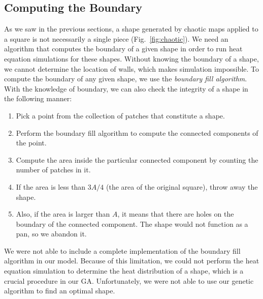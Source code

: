 \documentclass[12pt]{reedmcm}
\begin{document}
\subsection{Computing the Boundary}
As we saw in the previous sections, a shape generated by chaotic maps applied to a square is not necessarily a single piece (Fig.~\ref{fig:chaotic}).
We need an algorithm that computes the boundary of a given shape in order to run heat equation simulations for these shapes.
Without knowing the boundary of a shape, we cannot determine the location of walls, which makes simulation impossible.
To compute the boundary of any given shape, we use the \textit{boundary fill algorithm}.
With the knowledge of boundary, we can also check the integrity of a shape in the following manner:
\begin{enumerate}
  \item Pick a point from the collection of patches that constitute a shape.
  \item Perform the boundary fill algorithm to compute the connected components of the point.
  \item Compute the area inside the particular connected component by counting the number of patches in it.
  \item If the area is less than $3A/4$ (the area of the original square), throw away the shape.
  \item Also, if the area is larger than $A$, it means that there are holes on the boundary of the connected component. The shape would not function as a pan, so we abandon it.
\end{enumerate}
We were not able to include a complete implementation of the boundary fill algorithm in our model.
Because of this limitation, we could not perform the heat equation simulation to determine the heat distribution of a shape, which is a crucial procedure in our GA.
Unfortunately, we were not able to use our genetic algorithm to find an optimal shape.
\end{document}
